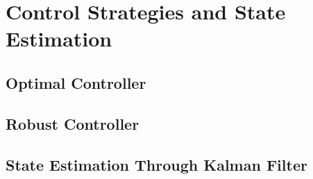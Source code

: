\chapter{Control Strategies and State Estimation} \label{ch:controlandestimation}

\section{Optimal Controller}

\section{Robust Controller}

\section{State Estimation Through Kalman Filter}